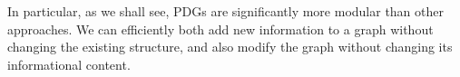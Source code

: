 \documentclass{article}
\newcommand{\MN}{PDG}
\numberwithin{equation}{section}
\begin{document}
\begin{notfocus}
In particular, as we shall see, \MN s are significantly more modular
than other approaches.
We can efficiently both add new information to a graph
without changing the existing structure, 
and also modify the graph without changing its informational content.
%
%

\end{notfocus}
\end{document}
